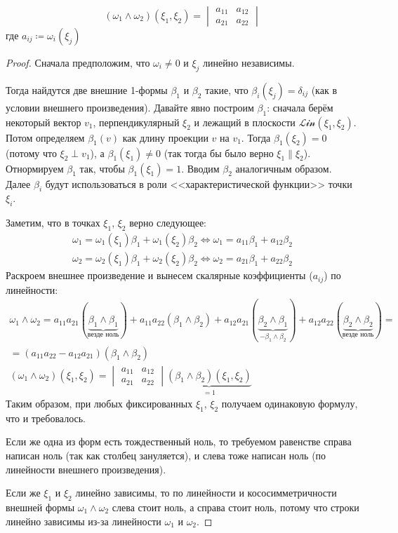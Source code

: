 \begin{theorem}
	\[ (\omega_1 \wedge \omega_2)(\xi_1, \xi_2) = \begin{vmatrix} a_{11} & a_{12} \\ a_{21} & a_{22} \end{vmatrix} \]
	где $a_{ij} \coloneq \omega_i(\xi_j)$
\end{theorem}
\begin{proof}
	Сначала предположим, что $\omega_i \neq 0$ и $\xi_j$ линейно независимы.

	Тогда найдутся две внешние 1-формы $\beta_1$ и $\beta_2$ такие, что $\beta_i(\xi_j) = \delta_{ij}$ (как в условии внешнего произведения).
	Давайте явно построим $\beta_1$: сначала берём некоторый вектор $v_1$, перпендикулярный $\xi_2$ и лежащий в плоскости $\mathcal{Lin}(\xi_1, \xi_2)$.
	Потом определяем $\beta_1(v)$ как длину проекции $v$ на $v_1$.
	Тогда $\beta_1(\xi_2)=0$ (потому что $\xi_2\perp v_1$), а $\beta_1(\xi_1)\neq 0$ (так тогда бы было верно $\xi_1 \parallel \xi_2$).
	Отнормируем $\beta_1$ так, чтобы $\beta_1(\xi_1)=1$.
	Вводим $\beta_2$ аналогичным образом.
	Далее $\beta_i$ будут использоваться в роли <<характеристической функции>> точки $\xi_i$.

	Заметим, что в точках $\xi_1$, $\xi_2$ верно следующее:
	\begin{gather*}
		\omega_1 = \omega_1(\xi_1) \beta_1 + \omega_1(\xi_2) \beta_2
		\iff
		\omega_1 = a_{11} \beta_1 + a_{12} \beta_2 \\
		\omega_2 = \omega_2(\xi_1) \beta_1 + \omega_2(\xi_2) \beta_2
		\iff
		\omega_2 = a_{21} \beta_1 + a_{22} \beta_2
	\end{gather*}
	Раскроем внешнее произведение и вынесем скалярные коэффициенты ($a_{ij}$) по линейности:
	\begin{gather*}
		\omega_1 \wedge \omega_2
		= a_{11} a_{21} (\underbrace{\beta_1 \wedge \beta_1}_{\text{везде ноль}})
		+ a_{11} a_{22} (\beta_1 \wedge \beta_2)
		+ a_{12} a_{21} (\underbrace{\beta_2 \wedge \beta_1}_{-\beta_1 \wedge \beta_2})
		+ a_{12} a_{22} (\underbrace{\beta_2 \wedge \beta_2}_{\text{везде ноль}}) = \\
		= (a_{11} a_{22} - a_{12} a_{21}) (\beta_1 \wedge \beta_2) \\
		(\omega_1 \wedge \omega_2) (\xi_1, \xi_2)
		= \begin{vmatrix} a_{11} & a_{12} \\ a_{21} & a_{22} \end{vmatrix} \underbrace{(\beta_1 \wedge \beta_2) (\xi_1, \xi_2)}_{=1}
	\end{gather*}
	Таким образом, при любых фиксированных $\xi_1$, $\xi_2$ получаем одинаковую формулу, что и требовалось.

	Если же одна из форм есть тождественный ноль, то требуемом равенстве справа написан ноль
	(так как столбец зануляется), и слева тоже написан ноль (по линейности внешнего произведения).

	Если же $\xi_1$ и $\xi_2$ линейно зависимы, то по линейности и кососимметричности внешней формы $\omega_1 \wedge \omega_2$ слева стоит ноль,
	а справа стоит ноль, потому что строки линейно зависимы из-за линейности $\omega_1$ и $\omega_2$.
\end{proof}

